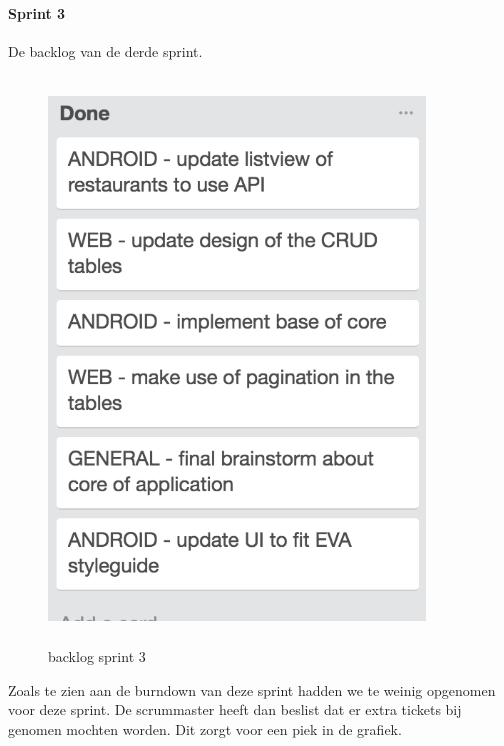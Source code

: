 \paragraph{Sprint 3}
De backlog van de derde sprint.

\begin{figure}[H]
	\centering
\includegraphics[width=10cm,height=15cm]{img/backlog_week3.png}
\caption{backlog sprint 3}
\end{figure}

Zoals te zien aan de burndown van deze sprint hadden we te weinig opgenomen voor deze sprint. De scrummaster heeft dan beslist dat er extra tickets bij genomen mochten worden. Dit zorgt voor een piek in de grafiek.

